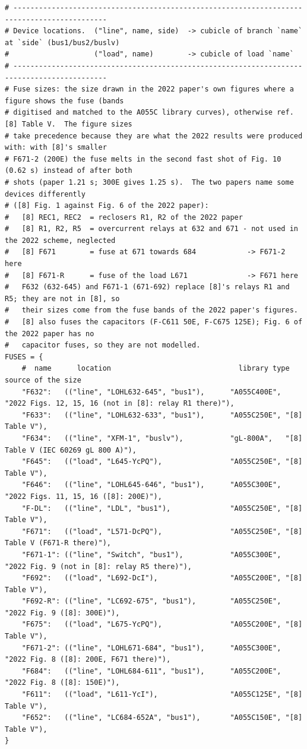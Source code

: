 \documentclass[12pt,a4paper]{article}
\begin{document}
\begin{lstlisting}
# --------------------------------------------------------------------------------------------
# Device locations.  ("line", name, side)  -> cubicle of branch `name` at `side` (bus1/bus2/buslv)
#                    ("load", name)        -> cubicle of load `name`
# --------------------------------------------------------------------------------------------
# Fuse sizes: the size drawn in the 2022 paper's own figures where a figure shows the fuse (bands
# digitised and matched to the A055C library curves), otherwise ref. [8] Table V.  The figure sizes
# take precedence because they are what the 2022 results were produced with: with [8]'s smaller
# F671-2 (200E) the fuse melts in the second fast shot of Fig. 10 (0.62 s) instead of after both
# shots (paper 1.21 s; 300E gives 1.25 s).  The two papers name some devices differently
# ([8] Fig. 1 against Fig. 6 of the 2022 paper):
#   [8] REC1, REC2  = reclosers R1, R2 of the 2022 paper
#   [8] R1, R2, R5  = overcurrent relays at 632 and 671 - not used in the 2022 scheme, neglected
#   [8] F671        = fuse at 671 towards 684            -> F671-2 here
#   [8] F671-R      = fuse of the load L671              -> F671 here
#   F632 (632-645) and F671-1 (671-692) replace [8]'s relays R1 and R5; they are not in [8], so
#   their sizes come from the fuse bands of the 2022 paper's figures.
#   [8] also fuses the capacitors (F-C611 50E, F-C675 125E); Fig. 6 of the 2022 paper has no
#   capacitor fuses, so they are not modelled.
FUSES = {
    #  name      location                              library type   source of the size
    "F632":   (("line", "LOHL632-645", "bus1"),      "A055C400E", "2022 Figs. 12, 15, 16 (not in [8]: relay R1 there)"),
    "F633":   (("line", "LOHL632-633", "bus1"),      "A055C250E", "[8] Table V"),
    "F634":   (("line", "XFM-1", "buslv"),           "gL-800A",   "[8] Table V (IEC 60269 gL 800 A)"),
    "F645":   (("load", "L645-YcPQ"),                "A055C250E", "[8] Table V"),
    "F646":   (("line", "LOHL645-646", "bus1"),      "A055C300E", "2022 Figs. 11, 15, 16 ([8]: 200E)"),
    "F-DL":   (("line", "LDL", "bus1"),              "A055C250E", "[8] Table V"),
    "F671":   (("load", "L571-DcPQ"),                "A055C250E", "[8] Table V (F671-R there)"),
    "F671-1": (("line", "Switch", "bus1"),           "A055C300E", "2022 Fig. 9 (not in [8]: relay R5 there)"),
    "F692":   (("load", "L692-DcI"),                 "A055C200E", "[8] Table V"),
    "F692-R": (("line", "LC692-675", "bus1"),        "A055C250E", "2022 Fig. 9 ([8]: 300E)"),
    "F675":   (("load", "L675-YcPQ"),                "A055C200E", "[8] Table V"),
    "F671-2": (("line", "LOHL671-684", "bus1"),      "A055C300E", "2022 Fig. 8 ([8]: 200E, F671 there)"),
    "F684":   (("line", "LOHL684-611", "bus1"),      "A055C200E", "2022 Fig. 8 ([8]: 150E)"),
    "F611":   (("load", "L611-YcI"),                 "A055C125E", "[8] Table V"),
    "F652":   (("line", "LC684-652A", "bus1"),       "A055C150E", "[8] Table V"),
}


\end{lstlisting}
\end{document}
